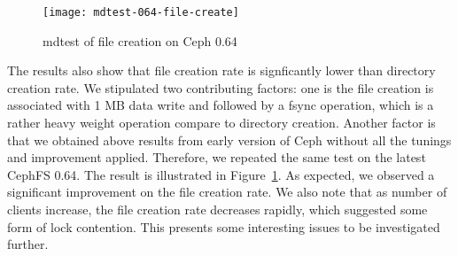 \begin{figure}[htb]
\centering
\texttt{[image: mdtest-064-file-create]}
\caption{mdtest of file creation on Ceph 0.64}
\label{fig:mdtest-064-file-create}
\end{figure}


The results also show that file creation rate is signficantly lower than
directory creation rate. We stipulated two contributing factors: one is the file
creation is associated with 1 MB data write and followed by a fsync operation,
which is a rather heavy weight operation compare to directory creation. Another
factor is that we obtained above results from early version of Ceph without all
the tunings and improvement applied. Therefore, we repeated the same test on the
latest CephFS 0.64. The result is illustrated in
Figure~\ref{fig:mdtest-064-file-create}. As expected, we observed a significant
improvement on the file creation rate. We also note that as number of clients
increase, the file creation rate decreases rapidly, which suggested some form of
lock contention. This presents some interesting issues to be investigated
further.


